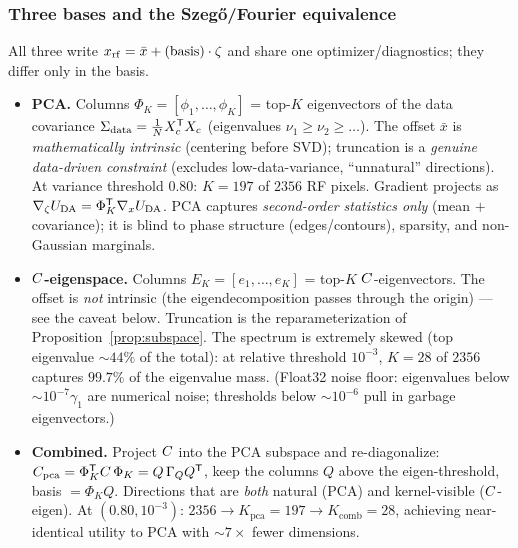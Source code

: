 \subsubsection{Three bases and the Szeg\H{o}/Fourier equivalence}
All three write $x_{\mathrm{rf}}=\bar{x}+\text{(basis)}\cdot\zeta$ and share one
optimizer/diagnostics; they differ only in the basis.
\begin{itemize}[leftmargin=1.4em]
  \item \textbf{PCA.} Columns $\Phi_K=[\phi_1,\dots,\phi_K]$ = top-$K$ eigenvectors
        of the data covariance $\Sigma_{\mathrm{data}}=\tfrac1N X_c^{\mathsf{T}} X_c$
        (eigenvalues $\nu_1\ge\nu_2\ge\dots$). The offset $\bar{x}$ is
        \emph{mathematically intrinsic} (centering before SVD); truncation is a
        \emph{genuine data-driven constraint} (excludes low-data-variance,
        ``unnatural'' directions). At variance threshold $0.80$: $K=197$ of
        $2356$ RF pixels. Gradient projects as $\nabla_\zeta U_{\mathrm{DA}}=\Phi_K^{\mathsf{T}}\nabla_xU_{\mathrm{DA}}$.
        PCA captures \emph{second-order statistics only} (mean $+$ covariance);
        it is blind to phase structure (edges/contours), sparsity, and
        non-Gaussian marginals.
  \item \textbf{$C$-eigenspace.} Columns $E_K=[e_1,\dots,e_K]$ = top-$K$
        $C$-eigenvectors. The offset is \emph{not} intrinsic (the
        eigendecomposition passes through the origin) --- see the caveat below.
        Truncation is the reparameterization of Proposition~\ref{prop:subspace}.
        The spectrum is extremely skewed (top eigenvalue $\sim44\%$ of the total):
        at relative threshold $10^{-3}$, $K=28$ of $2356$ captures $99.7\%$ of the
        eigenvalue mass. (Float32 noise floor: eigenvalues below $\sim10^{-7}\gamma_1$
        are numerical noise; thresholds below $\sim10^{-6}$ pull in garbage
        eigenvectors.)
  \item \textbf{Combined.} Project $C$ into the PCA subspace and re-diagonalize:
        $C_{\mathrm{pca}}=\Phi_K^{\mathsf{T}}C\,\Phi_K=Q\,\Gamma_Q Q^{\mathsf{T}}$,
        keep the columns $Q$ above the eigen-threshold, basis $=\Phi_K Q$.
        Directions that are \emph{both} natural (PCA) and kernel-visible
        ($C$-eigen). At $(0.80,10^{-3})$: $2356\to K_{\mathrm{pca}}=197\to
        K_{\mathrm{comb}}=28$, achieving near-identical utility to PCA with
        $\sim7\times$ fewer dimensions.
\end{itemize}

